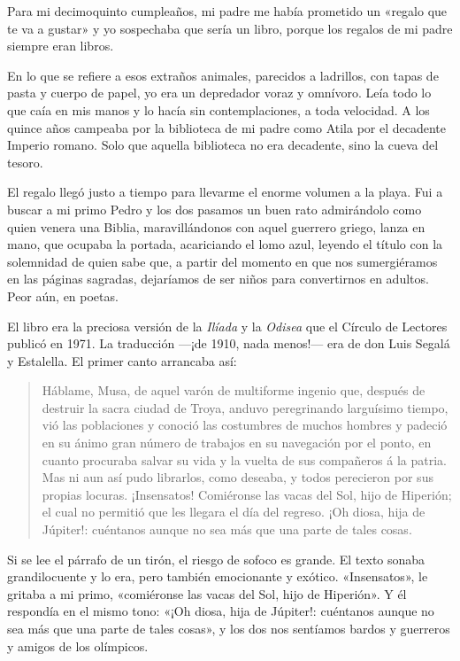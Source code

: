 \label{cap:nolan}

Para mi decimoquinto cumpleaños, mi padre me había prometido un «regalo que te va a gustar» y yo sospechaba que sería un libro, porque los regalos de mi padre siempre eran libros.

En lo que se refiere a esos extraños animales, parecidos a ladrillos, con tapas de pasta y cuerpo de papel, yo era un depredador voraz y omnívoro. Leía todo lo que caía en mis manos y lo hacía sin contemplaciones, a toda velocidad.
A los quince años campeaba por la biblioteca de mi padre como Atila por el decadente Imperio romano. Solo que aquella biblioteca no era decadente, sino la cueva del tesoro.

El regalo llegó justo a tiempo para llevarme el enorme volumen a la playa. Fui a buscar a mi primo Pedro y los dos pasamos un buen rato admirándolo como quien venera una Biblia, maravillándonos con aquel guerrero griego, lanza en mano, que ocupaba la portada, acariciando el lomo azul, leyendo el título con la solemnidad de quien sabe que, a partir del momento en que nos sumergiéramos en las páginas sagradas, dejaríamos de ser niños para convertirnos en adultos. Peor aún, en poetas.

El libro era la preciosa versión de la \emph{Ilíada} y la \emph{Odisea} que el Círculo de Lectores publicó en 1971. La traducción ---¡de 1910, nada menos!--- era de don Luis Segalá y Estalella.
El primer canto arrancaba así:

\begin{quote}
Háblame, Musa, de aquel varón de multiforme ingenio que, después de destruir la sacra ciudad de Troya, anduvo peregrinando larguísimo tiempo, vió las poblaciones y conoció las costumbres de muchos hombres y padeció en su ánimo gran número de trabajos en su navegación por el ponto, en cuanto procuraba salvar su vida y la vuelta de sus compañeros á la patria. Mas ni aun así pudo librarlos, como deseaba, y todos perecieron por sus propias locuras. ¡Insensatos! Comiéronse las vacas del Sol, hijo de Hiperión; el cual no permitió que les llegara el día del regreso. ¡Oh diosa, hija de Júpiter!: cuéntanos aunque no sea más que una parte de tales cosas.
\end{quote}

Si se lee el párrafo de un tirón, el riesgo de sofoco es grande. El texto sonaba grandilocuente y lo era, pero también emocionante y exótico. «Insensatos», le gritaba a mi primo, «comiéronse las vacas del Sol, hijo de Hiperión». Y él respondía en el mismo tono: «¡Oh diosa, hija de Júpiter!: cuéntanos aunque no sea más que una parte de tales cosas», y los dos nos sentíamos bardos y guerreros y amigos de los olímpicos.

